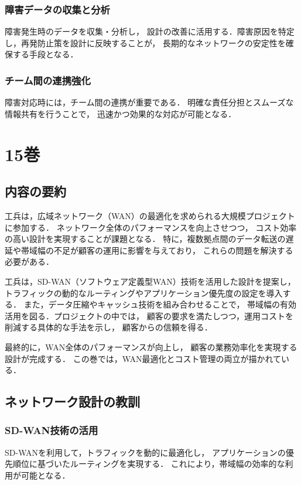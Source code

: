 \documentclass[titlepage,a4paper]{jsarticle}
\begin{document}
\subsubsection{障害データの収集と分析}
障害発生時のデータを収集・分析し，
設計の改善に活用する．障害原因を特定し，再発防止策を設計に反映することが，
長期的なネットワークの安定性を確保する手段となる．

\subsubsection{チーム間の連携強化}
障害対応時には，チーム間の連携が重要である．
明確な責任分担とスムーズな情報共有を行うことで，
迅速かつ効果的な対応が可能となる．

\newpage
\section{15巻}
\subsection{内容の要約}
工兵は，広域ネットワーク（WAN）の最適化を求められる大規模プロジェクトに参加する．
ネットワーク全体のパフォーマンスを向上させつつ，
コスト効率の高い設計を実現することが課題となる．
特に，複数拠点間のデータ転送の遅延や帯域幅の不足が顧客の運用に影響を与えており，
これらの問題を解決する必要がある．

工兵は，SD-WAN（ソフトウェア定義型WAN）技術を活用した設計を提案し，
トラフィックの動的なルーティングやアプリケーション優先度の設定を導入する．
また，データ圧縮やキャッシュ技術を組み合わせることで，
帯域幅の有効活用を図る．プロジェクトの中では，
顧客の要求を満たしつつ，運用コストを削減する具体的な手法を示し，
顧客からの信頼を得る．

最終的に，WAN全体のパフォーマンスが向上し，
顧客の業務効率化を実現する設計が完成する．
この巻では，WAN最適化とコスト管理の両立が描かれている．

\subsection{ネットワーク設計の教訓}
\subsubsection{SD-WAN技術の活用}
SD-WANを利用して，トラフィックを動的に最適化し，
アプリケーションの優先順位に基づいたルーティングを実現する．
これにより，帯域幅の効率的な利用が可能となる．
\end{document}
